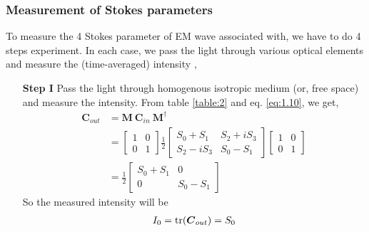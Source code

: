 \documentclass[11pt,a4paper]{article}
\numberwithin{equation}{section}
\begin{document}
\subsubsection{Measurement of Stokes parameters}
 To measure the 4 Stokes parameter of EM wave associated with, we have to do 4 steps experiment. In each case, we pass the light through various optical elements and measure the (time-averaged) intensity \cite{stokes},
 \begin{enumerate}
 	\item[\textbf{Step I}] 
 	Pass the light through homogenous isotropic medium (or, free space) and measure the intensity. From table \ref{table:2} and eq. \ref{eq:1.10}, we get,
 	\begin{align}
 		\boldsymbol{C}_{out} &= \boldsymbol{M}\:\boldsymbol{C}_{in}\:\boldsymbol{M}^\dagger\nonumber\\
 		&=\begin{bmatrix} 1 & 0 \\ 0 & 1 \end{bmatrix} 
 		\frac{1}{2} \begin{bmatrix} S_0+S_1 & S_2+iS_3 \\ S_2-iS_3 & S_0-S_1\end{bmatrix}
 		\begin{bmatrix} 1 & 0 \\ 0 & 1 \end{bmatrix}\nonumber\\
 		&= \frac{1}{2} \begin{bmatrix} S_0+S_1 & 0 \\ 0 & S_0-S_1\end{bmatrix}
 	\end{align}
 	So the measured intensity will be 
 	\begin{align}
 		I_0 = \tr(\boldsymbol{C}_{out}) = S_0 \label{s I}
 	\end{align}
 

\end{enumerate}
\end{document}
